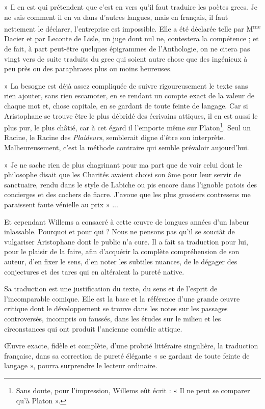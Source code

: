 \documentclass{book}%
\newcommand{\italique}[1]{\textit{#1}}%
\newcommand{\expo}[1]{\textsuperscript{#1}}%
\newcommand{\note}[1]{\footnote{#1}}
\begin{document}
» Il en est qui prétendent que c'est en vers qu'il faut traduire les poètes grecs. Je ne sais comment il en va dans d'autres langues, mais en français, il faut nettement le déclarer, l'entreprise est impossible. Elle a été déclarée telle par M\expo{me} Dacier et par Leconte de Lisle, un juge dont nul ne, contestera la compétence ; et de fait, à part peut-être quelques épigrammes de l'Anthologie, on ne citera pas vingt vers de suite traduits du grec qui soient autre chose que des ingénieux à peu près ou des paraphrases plus ou moins heureuses. 

» La besogne est déjà assez compliquée de suivre rigoureusement le texte sans rien ajouter, sans rien escamoter, en se rendant un compte exact de la valeur de chaque mot et, chose capitale, en se gardant de toute feinte de langage. Car si Aristophane se trouve être le plus débridé des écrivains attiques, il en est aussi le plus pur, le plus châtié, car à cet égard il l'emporte même sur Platon\note{Sans doute, pour l'impression, Willems eût écrit : « Il ne peut se comparer qu'à Platon ».}. Seul un Racine, le Racine des \italique{Plaideurs}, semblerait digne d'être son interprète. Malheureusement, c'est la méthode contraire qui semble prévaloir aujourd'hui. 

» Je ne sache rien de plus chagrinant pour ma part que de voir celui dont le philosophe disait que les Charités avaient choisi son âme pour leur servir de sanctuaire, rendu dans le style de Labiche ou pis encore dans l'ignoble patois des concierges et des cochers de fiacre. J'avoue que les plus grossiers contresens me paraissent faute vénielle au prix » ... 

Et cependant Willems a consacré à cette œuvre de longues années d'un labeur inlassable. Pourquoi et pour qui ? Nous ne pensons pas qu'il se souciât de vulgariser Aristophane dont le public n'a cure. Il a fait sa traduction pour lui, pour le plaisir de la faire, afin d'acquérir la complète compréhension de son auteur, d'en fixer le sens, d'en noter les subtiles nuances, de le dégager des conjectures et des tares qui en altéraient la pureté native. 

Sa traduction est une justification du texte, du sens et de l'esprit de l'incomparable comique. Elle est la base et la référence d'une grande œuvre critique dont le développement se trouve dans les notes sur les passages controversés, incompris ou faussés, dans les études sur le milieu et les circonstances qui ont produit l'ancienne comédie attique. 

Œuvre exacte, fidèle et complète, d'une probité littéraire singulière, la traduction française, dans sa correction de pureté élégante « se gardant de toute feinte de langage », pourra surprendre le lecteur ordinaire. 
\end{document}
